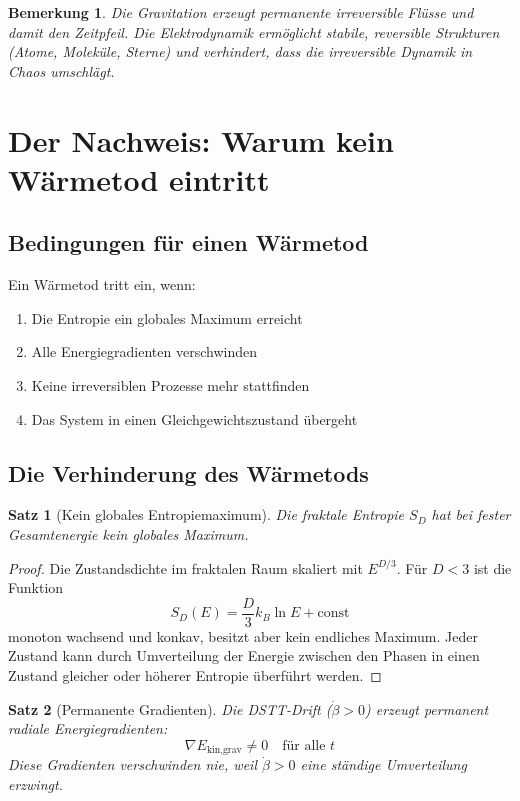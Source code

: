 \documentclass[12pt,a4paper]{article}
\newtheorem{satz}{Satz}
\newtheorem{bemerkung}{Bemerkung}
\begin{document}
\begin{bemerkung}
Die Gravitation erzeugt permanente irreversible Flüsse und damit den Zeitpfeil. Die Elektrodynamik ermöglicht stabile, reversible Strukturen (Atome, Moleküle, Sterne) und verhindert, dass die irreversible Dynamik in Chaos umschlägt.
\end{bemerkung}

\section{Der Nachweis: Warum kein Wärmetod eintritt}

\subsection{Bedingungen für einen Wärmetod}

Ein Wärmetod tritt ein, wenn:
\begin{enumerate}
    \item Die Entropie ein globales Maximum erreicht
    \item Alle Energiegradienten verschwinden
    \item Keine irreversiblen Prozesse mehr stattfinden
    \item Das System in einen Gleichgewichtszustand übergeht
\end{enumerate}

\subsection{Die Verhinderung des Wärmetods}

\begin{satz}[Kein globales Entropiemaximum]
Die fraktale Entropie $S_D$ hat bei fester Gesamtenergie kein globales Maximum.
\end{satz}

\begin{proof}
Die Zustandsdichte im fraktalen Raum skaliert mit $E^{D/3}$. Für $D<3$ ist die Funktion
\begin{equation}
S_D(E) = \frac{D}{3} k_B \ln E + \text{const}
\end{equation}
monoton wachsend und konkav, besitzt aber kein endliches Maximum. Jeder Zustand kann durch Umverteilung der Energie zwischen den Phasen in einen Zustand gleicher oder höherer Entropie überführt werden.
\end{proof}

\begin{satz}[Permanente Gradienten]
Die DSTT-Drift ($\dot{\beta}>0$) erzeugt permanent radiale Energiegradienten:
\begin{equation}
\nabla E_{\text{kin,grav}} \neq 0 \quad \text{für alle } t
\end{equation}
Diese Gradienten verschwinden nie, weil $\dot{\beta}>0$ eine ständige Umverteilung erzwingt.
\end{satz}
\end{document}
